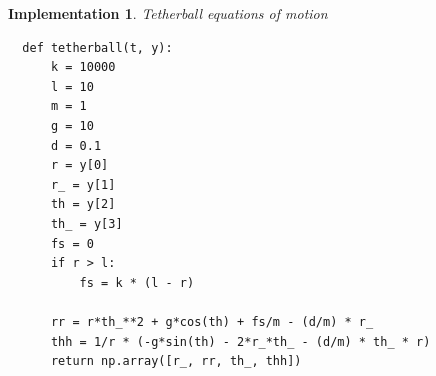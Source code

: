 \documentclass{article}
\newtheorem{implementation}{Implementation}[section]
\newcommand{\0}{\vb{0}}
\begin{document}
\begin{implementation}{Tetherball equations of motion}
  \begin{verbatim}
  def tetherball(t, y):
      k = 10000
      l = 10
      m = 1
      g = 10
      d = 0.1
      r = y[0]
      r_ = y[1]
      th = y[2]
      th_ = y[3]
      fs = 0
      if r > l:
          fs = k * (l - r)

      rr = r*th_**2 + g*cos(th) + fs/m - (d/m) * r_
      thh = 1/r * (-g*sin(th) - 2*r_*th_ - (d/m) * th_ * r)
      return np.array([r_, rr, th_, thh])
  \end{verbatim}
\end{implementation}

\nocite{burdenc2011}
\nocite{greenbaum2012}
\nocite{press2007}
\nocite{suli2010}


\end{document}
